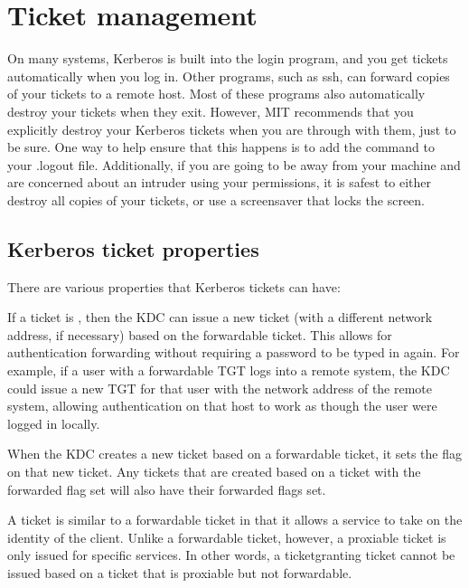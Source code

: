 \documentclass[letterpaper,10pt,english]{sphinxmanual}
\begin{document}
\chapter{Ticket management}
\label{\detokenize{user/tkt_mgmt:ticket-management}}\label{\detokenize{user/tkt_mgmt::doc}}
\sphinxAtStartPar
On many systems, Kerberos is built into the login program, and you get
tickets automatically when you log in.  Other programs, such as ssh,
can forward copies of your tickets to a remote host.  Most of these
programs also automatically destroy your tickets when they exit.
However, MIT recommends that you explicitly destroy your Kerberos
tickets when you are through with them, just to be sure.  One way to
help ensure that this happens is to add the {\hyperref[\detokenize{user/user_commands/kdestroy:kdestroy-1}]{}} command
to your .logout file.  Additionally, if you are going to be away from
your machine and are concerned about an intruder using your
permissions, it is safest to either destroy all copies of your
tickets, or use a screensaver that locks the screen.


\section{Kerberos ticket properties}
\label{\detokenize{user/tkt_mgmt:kerberos-ticket-properties}}
\sphinxAtStartPar
There are various properties that Kerberos tickets can have:

\sphinxAtStartPar
If a ticket is , then the KDC can issue a new ticket
(with a different network address, if necessary) based on the
forwardable ticket.  This allows for authentication forwarding without
requiring a password to be typed in again.  For example, if a user
with a forwardable TGT logs into a remote system, the KDC could issue
a new TGT for that user with the network address of the remote system,
allowing authentication on that host to work as though the user were
logged in locally.

\sphinxAtStartPar
When the KDC creates a new ticket based on a forwardable ticket, it
sets the  flag on that new ticket.  Any tickets that are
created based on a ticket with the forwarded flag set will also have
their forwarded flags set.

\sphinxAtStartPar
A  ticket is similar to a forwardable ticket in that it
allows a service to take on the identity of the client.  Unlike a
forwardable ticket, however, a proxiable ticket is only issued for
specific services.  In other words, a ticket\sphinxhyphen{}granting ticket cannot be
issued based on a ticket that is proxiable but not forwardable.
\end{document}
